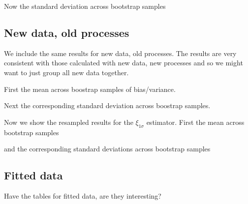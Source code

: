 

Now the standard deviation across bootstrap samples



\subsection{New data, old processes}

We include the same results for new data, old processes. The results are very
consistent with those calculated with new data, new processes and so we might
want to just group all new data together.

First the mean across boostrap samples of bias/variance.



Next the corresponding standard deviation across boostrap samples.



Now we show the resampled results for the $\xi_{1\sigma}$ estimator. First
the mean across bootstrap samples



and the corresponding standard deviations across bootstrap samples



\subsection{Fitted data}

Have the tables for fitted data, are they interesting?